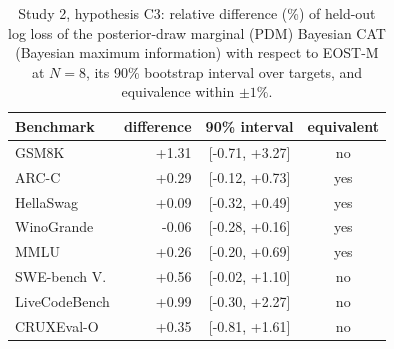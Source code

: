 \begin{table}[tbp]
\centering\footnotesize
\caption{Study 2, hypothesis C3: relative difference (\%) of held-out log loss of the posterior-draw marginal (PDM) Bayesian CAT (Bayesian maximum information) with respect to EOST-M at $N=8$, its 90\% bootstrap interval over targets, and equivalence within $\pm1\%$.}
\label{tab:equiv}
\begin{tabular}{@{}lrcc@{}}
\toprule
Benchmark & difference & 90\% interval & equivalent \\
\midrule
GSM8K & +1.31 & [-0.71, +3.27] & no \\
ARC-C & +0.29 & [-0.12, +0.73] & yes \\
HellaSwag & +0.09 & [-0.32, +0.49] & yes \\
WinoGrande & -0.06 & [-0.28, +0.16] & yes \\
MMLU & +0.26 & [-0.20, +0.69] & yes \\
SWE-bench V. & +0.56 & [-0.02, +1.10] & no \\
LiveCodeBench & +0.99 & [-0.30, +2.27] & no \\
CRUXEval-O & +0.35 & [-0.81, +1.61] & no \\
\bottomrule
\end{tabular}
\end{table}
